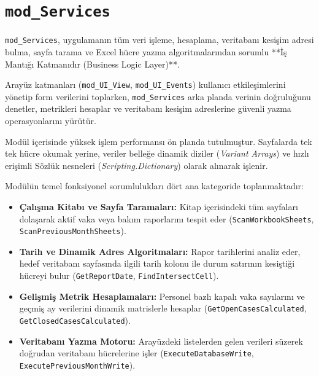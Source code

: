 \newpage


\section{\texttt{mod\_Services}}

\texttt{mod\_Services}, uygulamanın tüm veri işleme, hesaplama, veritabanı kesişim adresi bulma, sayfa tarama ve Excel hücre yazma algoritmalarından sorumlu **İş Mantığı Katmanıdır (Business Logic Layer)**. 

Arayüz katmanları (\texttt{mod\_UI\_View}, \texttt{mod\_UI\_Events}) kullanıcı etkileşimlerini yönetip form verilerini toplarken, \texttt{mod\_Services} arka planda verinin doğruluğunu denetler, metrikleri hesaplar ve veritabanı kesişim adreslerine güvenli yazma operasyonlarını yürütür.

Modül içerisinde yüksek işlem performansı ön planda tutulmuştur. Sayfalarda tek tek hücre okumak yerine, veriler belleğe dinamik diziler (\textit{Variant Arrays}) ve hızlı erişimli Sözlük nesneleri (\textit{Scripting.Dictionary}) olarak alınarak işlenir.

Modülün temel fonksiyonel sorumlulukları dört ana kategoride toplanmaktadır:

\begin{itemize}\setlength{\itemsep}{0pt}\setlength{\parskip}{1pt}
    \item \textbf{Çalışma Kitabı ve Sayfa Taramaları:} Kitap içerisindeki tüm sayfaları dolaşarak aktif vaka veya bakım raporlarını tespit eder (\texttt{ScanWorkbookSheets}, \texttt{ScanPreviousMonthSheets}).
    \item \textbf{Tarih ve Dinamik Adres Algoritmaları:} Rapor tarihlerini analiz eder, hedef veritabanı sayfasında ilgili tarih kolonu ile durum satırının kesiştiği hücreyi bulur (\texttt{GetReportDate}, \texttt{FindIntersectCell}).
    \item \textbf{Gelişmiş Metrik Hesaplamaları:} Personel bazlı kapalı vaka sayılarını ve geçmiş ay verilerini dinamik matrislerle hesaplar (\texttt{GetOpenCasesCalculated}, \texttt{GetClosedCasesCalculated}).
    \item \textbf{Veritabanı Yazma Motoru:} Arayüzdeki listelerden gelen verileri süzerek doğrudan veritabanı hücrelerine işler (\texttt{ExecuteDatabaseWrite}, \texttt{ExecutePreviousMonthWrite}).
\end{itemize}

